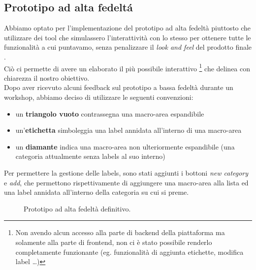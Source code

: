 \documentclass[12pt]{article} %
\begin{document}
\subsection{Prototipo ad alta fedelt\'a}
Abbiamo optato per l'implementazione del prototipo ad alta fedeltà piuttosto che utilizzare dei tool che simulassero l'interattività con lo stesso per ottenere tutte le funzionalità a cui puntavamo, senza penalizzare il \emph{look and feel} del prodotto finale \cite[p.~263]{InteractionDesign}.\\
Ciò ci permette di avere un elaborato il più possibile interattivo \footnote{Non avendo alcun accesso alla parte di backend della piattaforma ma solamente alla parte di frontend, non ci è stato possibile renderlo completamente funzionante (eg. funzionalità di aggiunta etichette, modifica label \dots)} che delinea con chiarezza il nostro obiettivo.\\
Dopo aver ricevuto alcuni feedback sul prototipo a bassa fedeltà durante un workshop, abbiamo deciso di utilizzare le seguenti convenzioni:
\begin{itemize}
\item un \textbf{triangolo vuoto} contrassegna una macro-area espandibile
\item un'\textbf{etichetta} simboleggia una label annidata all'interno di una macro-area
\item un \textbf{diamante} indica una macro-area non ulteriormente espandibile (una categoria attualmente senza labels al suo interno)
\end{itemize}
Per permettere la gestione delle labels, sono stati aggiunti i bottoni \emph{new category} e \emph{add}, che permettono rispettivamente di aggiungere una macro-area alla lista ed una label annidata all'interno della categoria su cui si preme.

\begin{figure}[H] 
\caption{Prototipo ad alta fedeltà definitivo.}
\label{fig:dopo}
\end{figure}
\end{document}
